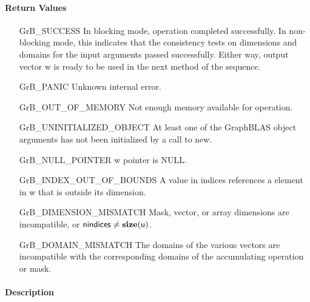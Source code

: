 \paragraph{Return Values}

\begin{itemize}[leftmargin=2.1in]
    \item[{\sf GrB\_SUCCESS}]         In blocking mode, operation
	completed successfully. In non-blocking mode, this indicates
	that the consistency tests on dimensions and domains for the
	input arguments passed successfully. Either way, output vector
	{\sf w} is ready to be used in the next method of the sequence.

    \item[{\sf GrB\_PANIC}]           Unknown internal error.
    
    \item[{\sf GrB\_OUT\_OF\_MEMORY}]        Not enough memory available for operation.
    
    \item[{\sf GrB\_UNINITIALIZED\_OBJECT}]        At least one of the GraphBLAS 
    object arguments has not been initialized by a call to {\sf new}.
    
    \item[{\sf GrB\_NULL\_POINTER}]  {\sf w} pointer is {\sf NULL}.

    \item[{\sf GrB\_INDEX\_OUT\_OF\_BOUNDS}]  A value in {\sf indices} references a 
    element in {\sf w} that is outside its dimension.
    
    \item[{\sf GrB\_DIMENSION\_MISMATCH}] Mask, vector, or array dimensions are
    incompatible, or ${\sf nindices} \neq \bold{size}({\sf u})$. 
    
    \item[{\sf GrB\_DOMAIN\_MISMATCH}]    The domains of the various
	vectors are incompatible with the corresponding domains of the
	accumulating operation or mask.
\end{itemize}

\paragraph{Description}

